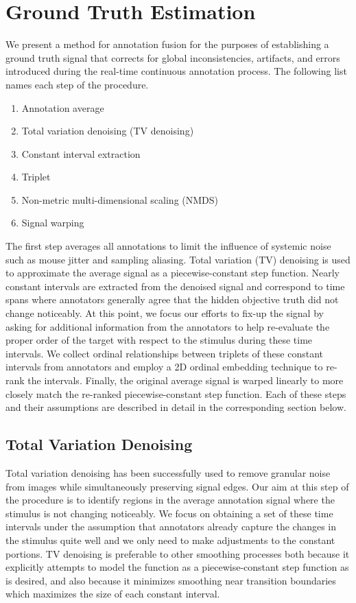\documentclass[]{article}
\begin{document}
\section{Ground Truth Estimation}

We present a method for annotation fusion for the purposes of establishing a ground truth signal that corrects for global inconsistencies, artifacts, and errors introduced during the real-time continuous annotation process.  The following list names each step of the procedure.

\begin{enumerate}
	\item Annotation average
	\item Total variation denoising (TV denoising)
	\item Constant interval extraction
	\item Triplet
	\item Non-metric multi-dimensional scaling (NMDS)
	\item Signal warping
\end{enumerate}

The first step averages all annotations to limit the influence of systemic noise such as mouse jitter and sampling aliasing.  Total variation (TV) denoising is used to approximate the average signal as a piecewise-constant step function.  Nearly constant intervals are extracted from the denoised signal and correspond to time spans where annotators generally agree that the hidden objective truth did not change noticeably.  At this point, we focus our efforts to fix-up the signal by asking for additional information from the annotators to help re-evaluate the proper order of the target with respect to the stimulus during these time intervals.  We collect ordinal relationships between triplets of these constant intervals from annotators and employ a 2D ordinal embedding technique to re-rank the intervals.  Finally, the original average signal is warped linearly to more closely match the re-ranked piecewise-constant step function.  Each of these steps and their assumptions are described in detail in the corresponding section below.

\subsection{Total Variation Denoising}
Total variation denoising has been successfully used to remove granular noise from images while simultaneously preserving signal edges.  Our aim at this step of the procedure is to identify regions in the average annotation signal where the stimulus is not changing noticeably.  We focus on obtaining a set of these time intervals under the assumption that annotators already capture the changes in the stimulus quite well and we only need to make adjustments to the constant portions.  TV denoising is preferable to other smoothing processes both because it explicitly attempts to model the function as a piecewise-constant step function as is desired, and also because it minimizes smoothing near transition boundaries which maximizes the size of each constant interval.
\end{document}
